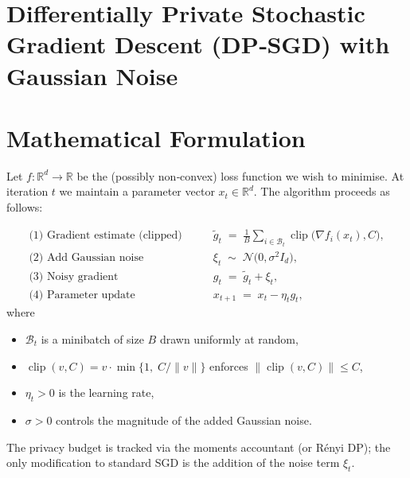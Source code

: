 \documentclass[11pt]{article}
\newcommand{\R}{\mathbb{R}}
\newcommand{\grad}{\nabla}
\begin{document}
\section*{Differentially Private Stochastic Gradient Descent (DP‑SGD) with Gaussian Noise}

\section*{Mathematical Formulation}
Let $f:\R^{d}\rightarrow\R$ be the (possibly non‑convex) loss function we wish to minimise.
At iteration $t$ we maintain a parameter vector $x_t\in\R^{d}$.  
The algorithm proceeds as follows:

\begin{align}
\text{(1)  Gradient estimate (clipped)}\qquad &
\tilde g_t \;=\; \frac{1}{B}\sum_{i\in\mathcal{B}_t}
\operatorname{clip}\!\bigl(\grad f_i(x_t),C\bigr),                       \label{eq:clip}\\[4pt]
\text{(2)  Add Gaussian noise} \qquad &
\xi_t \;\sim\; \mathcal{N}\!\bigl(0,\sigma^{2}I_d\bigr),                     \label{eq:noise}\\[4pt]
\text{(3)  Noisy gradient} \qquad &
g_t \;=\; \tilde g_t + \xi_t,                                            \label{eq:noisygrad}\\[4pt]
\text{(4)  Parameter update} \qquad &
x_{t+1}\;=\;x_t - \eta_t g_t,                                            \label{eq:update}
\end{align}
where
\begin{itemize}
    \item $\mathcal{B}_t$ is a minibatch of size $B$ drawn uniformly at random,
    \item $\operatorname{clip}(v,C)=v\cdot\min\!\bigl\{1,\;C/\|v\|\bigr\}$ enforces $\|\operatorname{clip}(v,C)\|\le C$,
    \item $\eta_t>0$ is the learning rate,
    \item $\sigma>0$ controls the magnitude of the added Gaussian noise.
\end{itemize}
The privacy budget is tracked via the moments accountant (or Rényi DP); the only modification to standard SGD is the addition of the noise term $\xi_t$.
\end{document}
